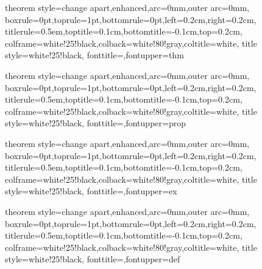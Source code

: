 

\usepackage[english]{babel}

\usepackage{tcolorbox}
{theorem style=change apart,enhanced,arc=0mm,outer arc=0mm,
    boxrule=0pt,toprule=1pt,bottomrule=0pt,left=0.2cm,right=0.2cm,
    titlerule=0.5em,toptitle=0.1cm,bottomtitle=-0.1cm,top=0.2cm,
    colframe=white!25!black,colback=white!80!gray,coltitle=white,
    title style={white!25!black},
    fonttitle=\sffamily,fontupper=\normalsize}{thm}

{theorem style=change apart,enhanced,arc=0mm,outer arc=0mm,
    boxrule=0pt,toprule=1pt,bottomrule=0pt,left=0.2cm,right=0.2cm,
    titlerule=0.5em,toptitle=0.1cm,bottomtitle=-0.1cm,top=0.2cm,
    colframe=white!25!black,colback=white!80!gray,coltitle=white,
    title style={white!25!black},
    fonttitle=\sffamily,fontupper=\normalsize}{prop}

{theorem style=change apart,enhanced,arc=0mm,outer arc=0mm,
    boxrule=0pt,toprule=1pt,bottomrule=0pt,left=0.2cm,right=0.2cm,
    titlerule=0.5em,toptitle=0.1cm,bottomtitle=-0.1cm,top=0.2cm,
    colframe=white!25!black,colback=white!80!gray,coltitle=white,
    title style={white!25!black},
    fonttitle=\sffamily,fontupper=\normalsize}{ex}

{theorem style=change apart,enhanced,arc=0mm,outer arc=0mm,
    boxrule=0pt,toprule=1pt,bottomrule=0pt,left=0.2cm,right=0.2cm,
    titlerule=0.5em,toptitle=0.1cm,bottomtitle=-0.1cm,top=0.2cm,
    colframe=white!25!black,colback=white!80!gray,coltitle=white,
    title style={white!25!black},
    fonttitle=\sffamily,fontupper=\normalsize}{def}



